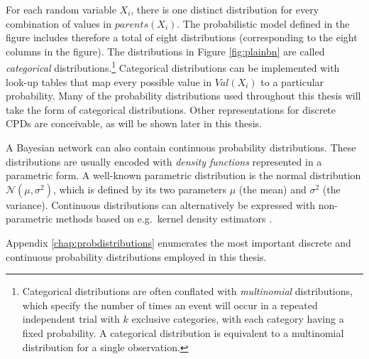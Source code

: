 
For each random variable $X_i$, there is one distinct distribution for every combination of values in $\mathit{parents}(X_i)$. The probabilistic model defined in the figure includes therefore a total of eight distributions (corresponding to the eight columns in the figure).  The distributions in Figure \ref{fig:plainbn} are called \textit{categorical} distributions.\footnote{Categorical distributions are often conflated with \textit{multinomial} distributions, which specify the number of times an event will occur in a repeated independent trial with $k$ exclusive categories, with each category having a fixed probability.  A categorical distribution is equivalent to a multinomial distribution for a single observation.} Categorical distributions can be implemented with look-up tables that map every possible value in $\mathit{Val}(X_i)$ to a particular probability.  Many of the probability distributions used throughout this thesis will take the form of categorical distributions. Other representations for discrete CPDs are conceivable, as will be shown later in this thesis.

A Bayesian network can also contain continuous probability distributions.  These distributions are usually encoded with \textit{density functions} represented in a parametric form.  A well-known parametric distribution is the normal distribution $\mathcal{N}(\mu,\sigma^2)$, which is defined by its two parameters $\mu$ (the mean) and $\sigma^2$ (the variance). Continuous distributions can alternatively be expressed with non-parametric methods based on e.g.\ kernel density estimators \cite[see e.g.][for more details on these continuous distributions]{Bishop:2006,Koller+Friedman:09} .


Appendix \ref{chap:probdistributions} enumerates the most important discrete and continuous probability distributions employed in this thesis.  %

